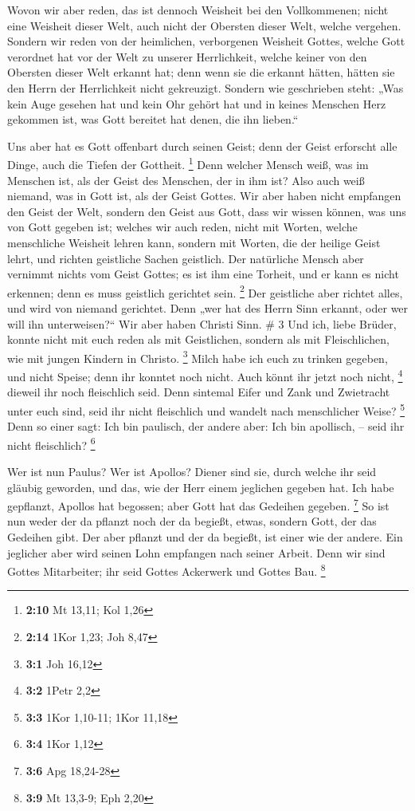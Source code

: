  Wovon wir aber reden, das ist dennoch Weisheit bei den
Vollkommenen; nicht eine Weisheit dieser Welt, auch nicht der Obersten
dieser Welt, welche vergehen.  Sondern wir reden von der
heimlichen, verborgenen Weisheit Gottes, welche Gott verordnet hat vor
der Welt zu unserer Herrlichkeit,  welche keiner von den
Obersten dieser Welt erkannt hat; denn wenn sie die erkannt hätten,
hätten sie den Herrn der Herrlichkeit nicht gekreuzigt. 
Sondern wie geschrieben steht: „Was kein Auge gesehen hat und kein Ohr
gehört hat und in keines Menschen Herz gekommen ist, was Gott bereitet
hat denen, die ihn lieben.``

 Uns aber hat es Gott offenbart durch seinen Geist; denn
der Geist erforscht alle Dinge, auch die Tiefen der Gottheit.
\footnote{\textbf{2:10} Mt 13,11; Kol 1,26}  Denn welcher
Mensch weiß, was im Menschen ist, als der Geist des Menschen, der in ihm
ist? Also auch weiß niemand, was in Gott ist, als der Geist Gottes.
 Wir aber haben nicht empfangen den Geist der Welt,
sondern den Geist aus Gott, dass wir wissen können, was uns von Gott
gegeben ist;  welches wir auch reden, nicht mit Worten,
welche menschliche Weisheit lehren kann, sondern mit Worten, die der
heilige Geist lehrt, und richten geistliche Sachen geistlich.
 Der natürliche Mensch aber vernimmt nichts vom Geist
Gottes; es ist ihm eine Torheit, und er kann es nicht erkennen; denn es
muss geistlich gerichtet sein. \footnote{\textbf{2:14} 1Kor 1,23; Joh
  8,47}  Der geistliche aber richtet alles, und wird von
niemand gerichtet.  Denn „wer hat des Herrn Sinn erkannt,
oder wer will ihn unterweisen?{}`` Wir aber haben Christi Sinn. \# 3
 Und ich, liebe Brüder, konnte nicht mit euch reden als
mit Geistlichen, sondern als mit Fleischlichen, wie mit jungen Kindern
in Christo. \footnote{\textbf{3:1} Joh 16,12}  Milch habe
ich euch zu trinken gegeben, und nicht Speise; denn ihr konntet noch
nicht. Auch könnt ihr jetzt noch nicht, \footnote{\textbf{3:2} 1Petr 2,2}
 dieweil ihr noch fleischlich seid. Denn sintemal Eifer
und Zank und Zwietracht unter euch sind, seid ihr nicht fleischlich und
wandelt nach menschlicher Weise? \footnote{\textbf{3:3} 1Kor 1,10-11;
  1Kor 11,18}  Denn so einer sagt: Ich bin paulisch, der
andere aber: Ich bin apollisch, -- seid ihr nicht fleischlich?
\footnote{\textbf{3:4} 1Kor 1,12}

 Wer ist nun Paulus? Wer ist Apollos? Diener sind sie,
durch welche ihr seid gläubig geworden, und das, wie der Herr einem
jeglichen gegeben hat.  Ich habe gepflanzt, Apollos hat
begossen; aber Gott hat das Gedeihen gegeben. \footnote{\textbf{3:6} Apg
  18,24-28}  So ist nun weder der da pflanzt noch der da
begießt, etwas, sondern Gott, der das Gedeihen gibt.  Der
aber pflanzt und der da begießt, ist einer wie der andere. Ein jeglicher
aber wird seinen Lohn empfangen nach seiner Arbeit.  Denn
wir sind Gottes Mitarbeiter; ihr seid Gottes Ackerwerk und Gottes Bau.
\footnote{\textbf{3:9} Mt 13,3-9; Eph 2,20}

